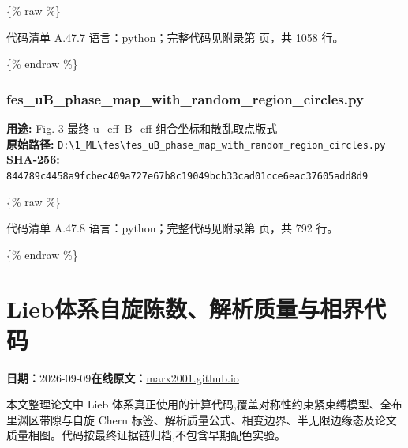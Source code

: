 \documentclass[lang=cn,scheme=chinese,color=blue,device=normal,toc=onecol,math=cm]{elegantbook}
\begin{document}
\{\% raw \%\}\par


\begin{codeindexbox}{代码清单 A.47.7}
语言：python；完整代码见附录第 \pageref{code:47:7} 页，共 1058 行。
\end{codeindexbox}


\{\% endraw \%\}\par


\subsubsection{fes\_\allowbreak{}uB\_\allowbreak{}phase\_\allowbreak{}map\_\allowbreak{}with\_\allowbreak{}random\_\allowbreak{}region\_\allowbreak{}circles.py}


\textbf{用途:} Fig. 3 最终 u\_\allowbreak{}eff–B\_\allowbreak{}eff 组合坐标和散乱取点版式\\ \textbf{原始路径:} \texttt{D:\textbackslash{}\allowbreak{}1\_\allowbreak{}ML\textbackslash{}\allowbreak{}fes\textbackslash{}\allowbreak{}fes\_\allowbreak{}uB\_\allowbreak{}phase\_\allowbreak{}map\_\allowbreak{}with\_\allowbreak{}random\_\allowbreak{}region\_\allowbreak{}circles.py}\\ \textbf{SHA-256:} \texttt{844789c4458a9fcbec409a727e67b8c19049bcb33cad01cce6eac37605add8d9}\par


\{\% raw \%\}\par


\begin{codeindexbox}{代码清单 A.47.8}
语言：python；完整代码见附录第 \pageref{code:47:8} 页，共 792 行。
\end{codeindexbox}


\{\% endraw \%\}\par



\section{Lieb体系自旋陈数、解析质量与相界代码}
\begin{articlemeta}
\textbf{日期：}2026-09-09\hfill\textbf{在线原文：}\href{https://marx2001.github.io/sci-note\_posts/20260909-altermagnetic-lieb-code/}{marx2001.github.io}
\end{articlemeta}

本文整理论文中 Lieb 体系真正使用的计算代码,覆盖对称性约束紧束缚模型、全布里渊区带隙与自旋 Chern 标签、解析质量公式、相变边界、半无限边缘态及论文质量相图。代码按最终证据链归档,不包含早期配色实验。\par
\end{document}
